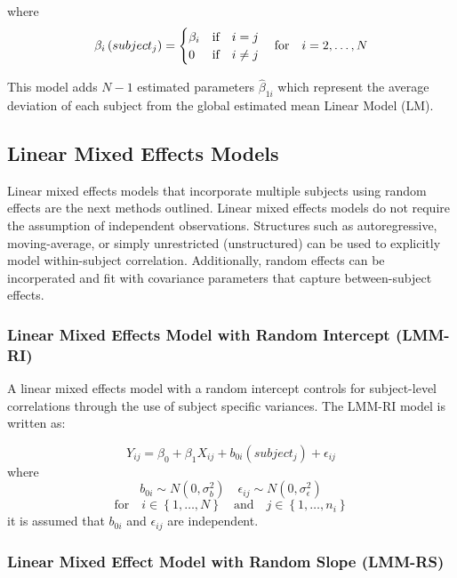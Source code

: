\documentclass[12pt,]{article}
\begin{document}
where \[
\beta_{i}\left(subject_{j} \right)=
\begin{cases}
\beta_{i} & \mbox{if} \quad i=j \\
0 & \mbox{if} \quad i \neq j \\
\end{cases}
\quad \text{for} \quad i=2,\ldots,N\\
\]

This model adds \(N-1\) estimated parameters \(\hat{\beta}_{1i}\) which
represent the average deviation of each subject from the global
estimated mean Linear Model (LM).

\hypertarget{linear-mixed-effects-models}{%
\subsection{Linear Mixed Effects
Models}\label{linear-mixed-effects-models}}

Linear mixed effects models that incorporate multiple subjects using
random effects are the next methods outlined. Linear mixed effects
models do not require the assumption of independent observations.
Structures such as autoregressive, moving-average, or simply
unrestricted (unstructured) can be used to explicitly model
within-subject correlation. Additionally, random effects can be
incorperated and fit with covariance parameters that capture
between-subject effects.

\hypertarget{linear-mixed-effects-model-with-random-intercept-lmm-ri}{%
\subsubsection{Linear Mixed Effects Model with Random Intercept
(LMM-RI)}\label{linear-mixed-effects-model-with-random-intercept-lmm-ri}}

A linear mixed effects model with a random intercept controls for
subject-level correlations through the use of subject specific
variances. The LMM-RI model is written as:

\[Y_{ij} = \beta_{0} + \beta_{1} X_{ij} + b_{0i}\left(subject_{j}\right) + \epsilon_{ij}\]
where
\[b_{0i} \sim N\left(0, \sigma_{b}^{2} \right) \quad \epsilon_{ij} \sim N\left(0, \sigma_{\epsilon}^{2} \right)\]
\[\text{for} \quad i \in \left \{ 1,\ldots,N   \right \} \quad \text{and} \quad j \in \left \{ 1,\ldots,n_{i}   \right \}\]
it is assumed that \(b_{0i}\) and \(\epsilon_{ij}\) are independent.

\hypertarget{linear-mixed-effect-model-with-random-slope-lmm-rs}{%
\subsubsection{Linear Mixed Effect Model with Random Slope
(LMM-RS)}\label{linear-mixed-effect-model-with-random-slope-lmm-rs}}
\end{document}
